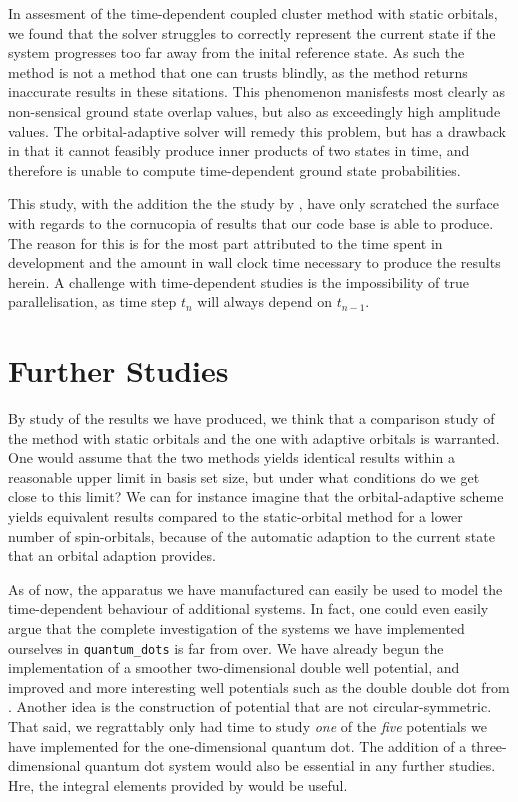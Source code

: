 In assesment of the time-dependent coupled cluster method with static orbitals,
we found that the solver struggles to correctly represent the current state if 
the system progresses too far away from the inital reference state. As such the 
method is not a method that one can trusts blindly, as the method returns
inaccurate results in these sitations. This phenomenon manisfests most clearly as 
non-sensical ground state overlap values, but also as exceedingly high amplitude 
values. The orbital-adaptive solver will remedy this problem, but has a drawback 
in that it cannot feasibly produce inner products of two states in time, and therefore 
is unable to compute time-dependent ground state probabilities.

This study, with the addition the the study by \citeauthor{islandwind2019}\cite{islandwind2019},
have only scratched the surface with regards to the cornucopia of results that our 
code base is able to produce. The reason for this is for the most part attributed to 
the time spent in development and the amount in wall clock time necessary to 
produce the results herein. A challenge with time-dependent studies is the 
impossibility of true parallelisation, as time step $t_n$ will always depend 
on $t_{n-1}$.

\section{Further Studies}

By study of the results we have produced, we think that a comparison study 
of the method with static orbitals and the one with adaptive orbitals is warranted.
One would assume that the two methods yields identical results within a reasonable 
upper limit in basis set size, but under what conditions do we get close to this
limit? We can for instance imagine that the orbital-adaptive scheme yields equivalent
results compared to the static-orbital method for a lower number of spin-orbitals,
because of the automatic adaption to the current state that an orbital adaption 
provides.

As of now, the apparatus we have manufactured can easily be used to model 
the time-dependent behaviour of additional systems. In fact, one could even 
easily argue that the complete investigation of the systems we have implemented 
ourselves in \lstinline{quantum_dots} is far from over. We have already begun
the implementation of a smoother two-dimensional double well potential, and 
improved and more interesting well potentials such as the double double dot 
from \citeauthor{nielsen2012configuration}\cite{nielsen2012configuration}. Another 
idea is the construction of potential that are not circular-symmetric.
That said, we regrattably only had time to study \emph{one} of the
\emph{five} potentials we have implemented for the one-dimensional quantum dot.
The addition of a three-dimensional quantum dot system would also be essential 
in any further studies. Hre, the integral elements provided by
\citeauthor{vorrath2003electronic}\cite{vorrath2003electronic} would be useful.

